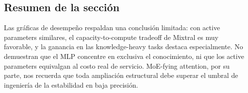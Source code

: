
\subsection{Resumen de la sección}

Las gráficas de desempeño respaldan una conclusión limitada: con active parameters similares, el capacity-to-compute tradeoff de Mixtral es muy favorable, y la ganancia en las knowledge-heavy tasks destaca especialmente. No demuestran que el MLP concentre en exclusiva el conocimiento, ni que los active parameters equivalgan al costo real de servicio. MoE-fying attention, por su parte, nos recuerda que toda ampliación estructural debe superar el umbral de ingeniería de la estabilidad en baja precisión.
